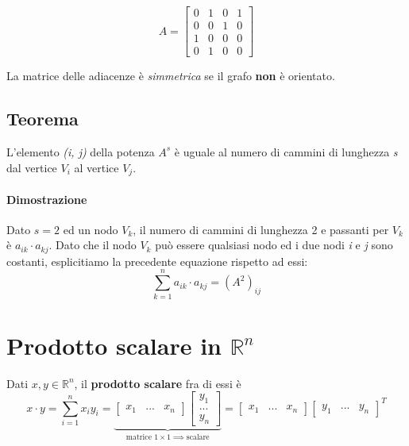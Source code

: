 		$$
		A =
		\begin{bmatrix}
			0 & 1 & 0 & 1 \\
			0 & 0 & 1 & 0 \\
			1 & 0 & 0 & 0 \\
			0 & 1 & 0 & 0
		\end{bmatrix}
		$$
		
		La matrice delle adiacenze è \textit{simmetrica} se il grafo \textbf{non} è orientato.
		
		\subsection{Teorema}
			L'elemento \textit{(i, j)} della potenza $ A^{s} $ è uguale al numero di cammini di lunghezza \textit{s} dal vertice $V_i$ al vertice $V_j$.
			
			\begin{GrayBox}
				\paragraph{Dimostrazione}
				Dato $ s = 2 $ ed un nodo $V_k$, il numero di cammini di lunghezza 2 e passanti per $V_k$ è $a_{ik} \cdot a_{kj}$.
				Dato che il nodo $V_k$ può essere qualsiasi nodo ed i due nodi \textit{i} e \textit{j} sono costanti, esplicitiamo la precedente equazione rispetto ad essi:
				$$ \sum_{k=1}^n a_{ik} \cdot a_{kj} = (A^2)_{ij} $$
			\end{GrayBox}
	
	\section{Prodotto scalare in $\mathbb{R}^n$}
		Dati $x,y \in \mathbb{R}^n $, il \textbf{prodotto scalare} fra di essi è
		$$ 
		x \cdot y = \sum_{i=1}^n x_iy_i =
		\underbrace{
			\begin{bmatrix}
				x_1 & ... & x_n
			\end{bmatrix}
			\begin{bmatrix}
				y_1 \\
				... \\
				y_n
			\end{bmatrix}
		}_{\text{matrice } 1 \times 1 \implies \text{scalare}}
		=
		\begin{bmatrix}
			x_1 & ... & x_n
		\end{bmatrix}
		\begin{bmatrix}
			y_1 & ... & y_n
		\end{bmatrix}^T
		$$
		
